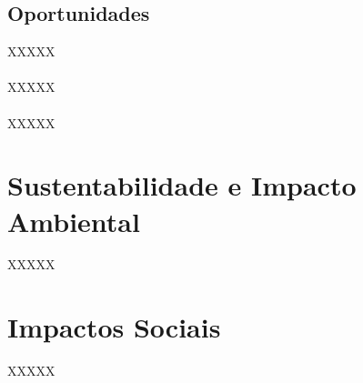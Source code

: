 \subsection{Oportunidades}

XXXXX
\\\\
XXXXX
\\\\
XXXXX


\section{Sustentabilidade e Impacto Ambiental}

XXXXX




\section{Impactos Sociais}

XXXXX
